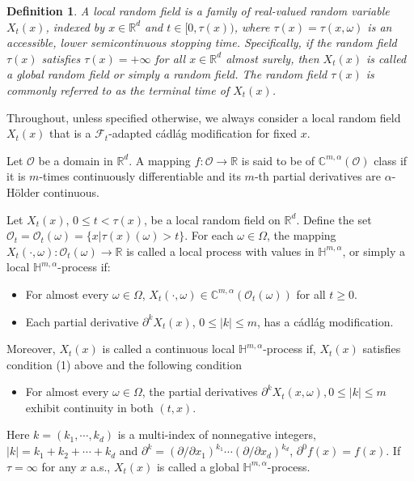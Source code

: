 \documentclass[12pt,oneside, reqno]{amsart}
\newtheorem{definition}[theorem]{Definition}
\def\mC{{\mathbb C}}
\def\mH{{\mathbb H}}
\def\mR{{\mathbb R}}
\def\sF{{\mathscr F}}
\def\sO{{\mathscr O}}
\def\geq{\geqslant}
\def\leq{\leqslant}
\numberwithin{equation}{section}
\begin{document}
\begin{definition}
	A local random field is a family of real-valued random variable $X_t(x)$, indexed by $x\in\mR^d$ and $t\in  [0,\tau(x))$,  where $\tau(x)=\tau(x,\omega)$ is an accessible, lower semicontinuous stopping time. Specifically, if the random field $\tau(x)$ satisfies $\tau(x)=+\infty$ for all $x\in \mR^d$ almost surely, then $X_t(x)$ is called a global random field or simply a random field. The random field $\tau(x)$ is commonly referred  to as the terminal time of $X_t(x)$.
\end{definition}

Throughout, unless specified otherwise, we always consider a local random field  $X_t(x)$ that is a $\sF_t$-adapted  c\'{a}dl\'{a}g modification for fixed $x$.

 Let $\sO$ be a domain in $\mR^d$. A mapping $f:\sO\to \mR$ is said to be of $\mC^{m,\alpha}(\sO)$ class if it is $m$-times continuously differentiable and its $m$-th partial derivatives are $\alpha$-H\"{o}lder continuous. 



Let $X_t(x)$, $0\leq t <\tau(x)$, be a local random field on $\mR^d$. Define the set $\sO_t=\sO_t(\omega)=\{x|\tau(x)(\omega)>t\}$. For each $\omega\in\Omega$, the mapping $X_t(\cdot,\omega): \sO_t(\omega)\to \mR$  is called a local process with values in 
  $\mH^{m,\alpha}$, or simply a  local  $\mH^{m,\alpha}$-process if:
\begin{itemize}
	\item [(1)] For almost every $\omega\in\Omega$, $X_t(\cdot,\omega)\in \mC^{m,\alpha}(\sO_t(\omega))$ for all $t\geq 0$.
	\item [(2)] Each partial derivative  $\partial^kX_t(x)$, $0\leq |k|\leq m$, has a   c\'{a}dl\'{a}g modification. 		
\end{itemize}
Moreover,  $X_t(x)$ is called a continuous local  $\mH^{m,\alpha}$-process if, $X_t(x)$ satisfies condition (1) above and the following condition
\begin{itemize}
	\item [(3)] For almost every $\omega\in\Omega$, the partial derivatives  $\partial^kX_t(x,\omega), 0\leq |k|\leq m$ exhibit continuity in both $(t,x)$.
\end{itemize}

 Here $k=(k_1,\cdots,k_d)$ is a multi-index of nonnegative integers, $|k|=k_1+k_2+\cdots+k_d$ and $\partial^k=(\partial/\partial x_1)^{k_1}\cdots (\partial/\partial x_d)^{k_d}$, $\partial^0 f(x)=f(x)$. If $\tau=\infty$ for any $x$ a.s., $X_t(x)$ is called a global $\mH^{m,\alpha}$-process.
 
\end{document}
